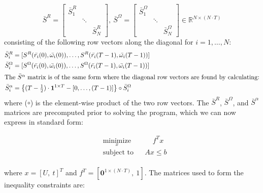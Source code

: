 \documentclass[letterpaper, 10 pt, conference]{ieeeconf}  %
\begin{document}
\begin{equation}
\bar{S}^R = \begin{bmatrix} \bar{S}^R_1& & \\ & \ddots & \\ & & \bar{S}^R_N \end{bmatrix}, \
\bar{S}^{\Omega} = \begin{bmatrix} \bar{S}^\Omega_1 & & \\ & \ddots & \\ & & \bar{S}^\Omega_N \end{bmatrix} \in \mathbb{R}^{N\times (N \cdot T)}
\end{equation}
consisting of the following row vectors along the diagonal for $i = 1,\ldots, N$: 
\begin{subequations}
\begin{align}
\bar{S}^R_i &= [ S^R(\bar{r_i}(0),\bar{\omega_i}(0)),  \ldots, S^R(\bar{r_i}(T-1),\bar{\omega_i}(T-1))] \\ %
\bar{S}^\Omega_i &= [ S^\Omega(\bar{r_i}(0),\bar{\omega_i}(0)),  \ldots, S^\Omega(\bar{r_i}(T-1),\bar{\omega_i}(T-1))] %
 \\
\intertext{The $\bar{S}^{\alpha}$ matrix is of the same form where the diagonal row vectors are found by calculating:}
\bar{S}^\alpha_i &= \left\{ (T-\tfrac{1}{2}) \cdot \mathbf{1}^{1 \times T} - [0, \dots, (T-1)] \right\} \circ \bar{S}^\Omega_i
\end{align}
\end{subequations}
%
where ($\circ$) is the element-wise product of the two row vectors. The $\bar{S}^R$, $\bar{S}^\Omega$, and $\bar{S}^\alpha$ matrices are precomputed prior to solving the program, \iffalse By assuming minimum drag conditions, we are underestimating the impact of the optimal inputs applied at each time step. Although this will result in a suboptimal solution, when applied to the simulation with a feedback strategy we are more likely to achieve our goal of forming an equally spaced constellation. \fi
which we can now express in standard form:

\begin{equation}
\begin{aligned}
& \underset{x}{\text{minimize}}
& & \ \ \ \ \ f^Tx \\
& \text{subject to}
& & Ax \leq b
\end{aligned}
\end{equation}
\\
where $x = [U, \ t]^T$ and $f^T = [\mathbf{0}^{1 \times (N \cdot T)}, \ 1]$. The matrices used to form the inequality constraints are: \\
\end{document}

